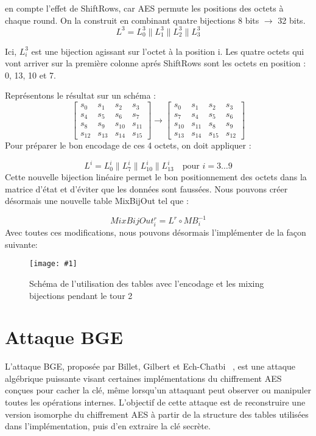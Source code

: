 \documentclass[a4paper, 10pt]{article}
\newcommand{\imagewidth}{0.9\textwidth}
\newcommand{\displayimage}[2]{
  \begin{figure}[H]
    \centering
    \texttt{[image: \#1]}
    \caption{#2}
  \end{figure}
}
\begin{document}
en compte l'effet de ShiftRows, car AES permute les 
positions des octets à chaque round. On la construit en combinant quatre bijections 8 bits $\rightarrow$ 32 bits.	
\[ L^{3} = L_{0}^{3} \parallel L_{1}^{3} \parallel L_{2}^{3} \parallel L_{3}^{3}\]

Ici, \(L_{i}^{3}\) est une bijection agissant sur l'octet à la position i.
Les quatre octets qui vont arriver sur la première colonne aprés ShiftRows sont les octets en position : 0, 13, 10 et 7.

Représentons le résultat sur un schéma :
\[
  \begin{bmatrix}
    s_{0} & s_{1} & s_{2} & s_{3} \\
    s_{4} & s_{5} & s_{6} & s_{7} \\
    s_{8} & s_{9} & s_{10} & s_{11} \\
    s_{12} & s_{13} & s_{14} & s_{15}
  \end{bmatrix}
  \rightarrow
  \begin{bmatrix}
    s_{0} & s_{1} & s_{2} & s_{3} \\
    s_{7} & s_{4} & s_{5} & s_{6} \\
    s_{10} & s_{11} & s_{8} & s_{9} \\
    s_{13} & s_{14} & s_{15} & s_{12}
  \end{bmatrix}
\]
Pour préparer le bon encodage de ces 4 octets, on doit appliquer :

\[ L^{i} = L_{0}^{i} \parallel L_{7}^{i} \parallel L_{10}^{i} \parallel L_{13}^{i}
\quad \text{pour } i = 3 \dots 9
\]
Cette nouvelle bijection linéaire permet le bon positionnement des octets dans la matrice d'état et 
d'éviter que les données sont faussées. Nous pouvons créer désormais une nouvelle table MixBijOut tel que :

\[ MixBijOut_{i}^{r} = L^{r} \circ MB_{i}^{-1}\]
Avec toutes ces modifications, nous pouvons désormais l'implémenter de la façon suivante:\\
\displayimage{images/schéma_encodage+mixing_bijections.png}{Schéma de l'utilisation des tables avec l'encodage et les mixing bijections pendant le tour 2}

\section{Attaque BGE}
\label{sec:attack}
L'attaque BGE, proposée par Billet, Gilbert et Ech-Chatbi ~\cite{key2}, est une attaque algébrique puissante 
visant certaines implémentations du chiffrement AES conçues pour cacher la clé, même lorsqu’un attaquant peut 
observer ou manipuler toutes les opérations internes. L’objectif de cette attaque est de reconstruire une version 
isomorphe du chiffrement AES à partir de la structure des tables utilisées dans l’implémentation, puis d’en extraire la clé secrète.
\end{document}
